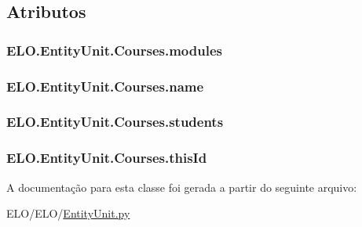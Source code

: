 \subsection{Atributos}
\hypertarget{classELO_1_1EntityUnit_1_1Courses_a14bdc53eeb2a7fde8e926cbab6e5206f}{
\subsubsection[{modules}]{\setlength{\rightskip}{0pt plus 5cm}E\-L\-O.\-Entity\-Unit.\-Courses.\-modules}}\label{d2/dc4/classELO_1_1EntityUnit_1_1Courses_a14bdc53eeb2a7fde8e926cbab6e5206f}
\hypertarget{classELO_1_1EntityUnit_1_1Courses_aeb94f54ad74895834eb7627dd38e1c8e}{
\subsubsection[{name}]{\setlength{\rightskip}{0pt plus 5cm}E\-L\-O.\-Entity\-Unit.\-Courses.\-name}}\label{d2/dc4/classELO_1_1EntityUnit_1_1Courses_aeb94f54ad74895834eb7627dd38e1c8e}
\hypertarget{classELO_1_1EntityUnit_1_1Courses_ac8e5e595ec895e03b088764d7506e735}{
\subsubsection[{students}]{\setlength{\rightskip}{0pt plus 5cm}E\-L\-O.\-Entity\-Unit.\-Courses.\-students}}\label{d2/dc4/classELO_1_1EntityUnit_1_1Courses_ac8e5e595ec895e03b088764d7506e735}
\hypertarget{classELO_1_1EntityUnit_1_1Courses_a283b817d129a8d15e3bce56b368a169d}{
\subsubsection[{this\-Id}]{\setlength{\rightskip}{0pt plus 5cm}E\-L\-O.\-Entity\-Unit.\-Courses.\-this\-Id}}\label{d2/dc4/classELO_1_1EntityUnit_1_1Courses_a283b817d129a8d15e3bce56b368a169d}


A documentação para esta classe foi gerada a partir do seguinte arquivo\-:\begin{DoxyCompactItemize}
\item 
E\-L\-O/\-E\-L\-O/\hyperlink{EntityUnit_8py}{Entity\-Unit.\-py}\end{DoxyCompactItemize}
